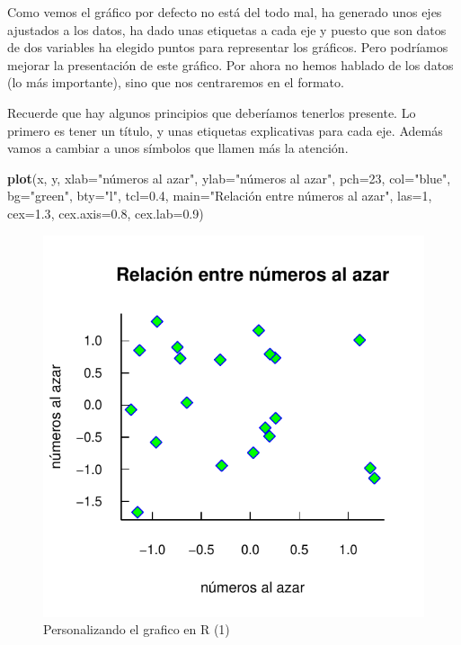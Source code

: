\documentclass[]{article}
\newenvironment{Shaded}{\begin{snugshade}}{\end{snugshade}}
\newcommand{\KeywordTok}[1]{\textcolor[rgb]{0.13,0.29,0.53}{\textbf{{#1}}}}
\newcommand{\DataTypeTok}[1]{\textcolor[rgb]{0.13,0.29,0.53}{{#1}}}
\newcommand{\DecValTok}[1]{\textcolor[rgb]{0.00,0.00,0.81}{{#1}}}
\newcommand{\FloatTok}[1]{\textcolor[rgb]{0.00,0.00,0.81}{{#1}}}
\newcommand{\StringTok}[1]{\textcolor[rgb]{0.31,0.60,0.02}{{#1}}}
\newcommand{\NormalTok}[1]{{#1}}
\begin{document}
Como vemos el gráfico por defecto no está del todo mal, ha generado unos
ejes ajustados a los datos, ha dado unas etiquetas a cada eje y puesto
que son datos de dos variables ha elegido puntos para representar los
gráficos. Pero podríamos mejorar la presentación de este gráfico. Por
ahora no hemos hablado de los datos (lo más importante), sino que nos
centraremos en el formato.

Recuerde que hay algunos principios que deberíamos tenerlos presente. Lo
primero es tener un título, y unas etiquetas explicativas para cada eje.
Además vamos a cambiar a unos símbolos que llamen más la atención.

\begin{Shaded}
\begin{Highlighting}[]
\KeywordTok{plot}\NormalTok{(x, y, }\DataTypeTok{xlab=}\StringTok{"números al azar"}\NormalTok{, }\DataTypeTok{ylab=}\StringTok{"números al azar"}\NormalTok{, }\DataTypeTok{pch=}\DecValTok{23}\NormalTok{, }\DataTypeTok{col=}\StringTok{"blue"}\NormalTok{, }\DataTypeTok{bg=}\StringTok{"green"}\NormalTok{, }\DataTypeTok{bty=}\StringTok{"l"}\NormalTok{, }\DataTypeTok{tcl=}\FloatTok{0.4}\NormalTok{, }\DataTypeTok{main=}\StringTok{"Relación entre números al azar"}\NormalTok{, }\DataTypeTok{las=}\DecValTok{1}\NormalTok{, }
     \DataTypeTok{cex=}\FloatTok{1.3}\NormalTok{, }\DataTypeTok{cex.axis=}\FloatTok{0.8}\NormalTok{, }\DataTypeTok{cex.lab=}\FloatTok{0.9}\NormalTok{)}
\end{Highlighting}
\end{Shaded}

\begin{figure}

{\centering \includegraphics{index_files/figure-latex/unnamed-chunk-11-1} 

}

\caption{Personalizando el grafico en R (1)}\label{fig:unnamed-chunk-11}
\end{figure}
\end{document}
